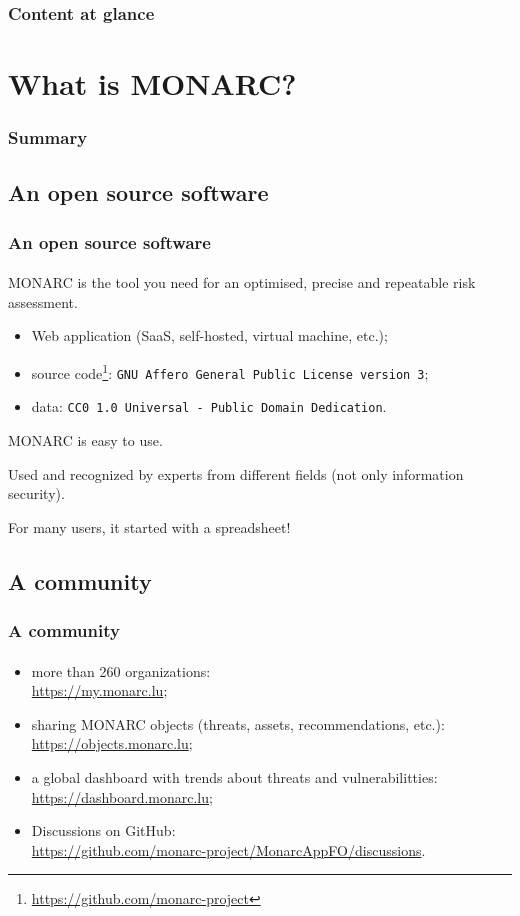 \setcounter{tocdepth}{1}
\begin{frame}
  \frametitle{Content at glance}
  \tableofcontents
\end{frame}
\setcounter{tocdepth}{4}

%
%
\section{What is MONARC?}
\begin{frame}
  \frametitle{Summary}
\end{frame}
\subsection{An open source software}
\begin{frame}
  \frametitle{An open source software}
  \framesubtitle{}
  MONARC is the tool you need for an optimised, precise and repeatable risk assessment.

  \bigskip
  \begin{itemize}
    \item Web application (SaaS, self-hosted, virtual machine, etc.);
    \item source code\footnote{\url{https://github.com/monarc-project}}:
    \texttt{GNU Affero General Public License version 3};
    \item data: \texttt{CC0 1.0 Universal - Public Domain Dedication}.
  \end{itemize}

  \bigskip
  MONARC is easy to use.

  Used and recognized by experts from different fields (not only information security).

  \bigskip
  For many users, it started with a spreadsheet!
\end{frame}

\subsection{A community}
\begin{frame}
  \frametitle{A community}
  \framesubtitle{}
  \begin{itemize}
    \item more than 260 organizations:\\ \url{https://my.monarc.lu};
    \item sharing MONARC objects (threats, assets, recommendations, etc.):\\
    \url{https://objects.monarc.lu};
    \item a global dashboard with trends about threats and vulnerabilitties:\\
    \url{https://dashboard.monarc.lu};
    \item Discussions on GitHub:\\
    \url{https://github.com/monarc-project/MonarcAppFO/discussions}.
  \end{itemize}
\end{frame}

